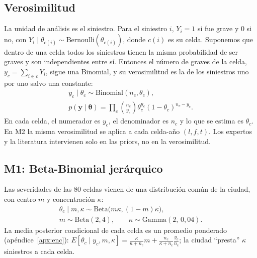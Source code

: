 \documentclass[10pt,twocolumn]{article}
\begin{document}
\subsection{Verosimilitud}
La unidad de análisis es el siniestro. Para el siniestro $i$, $Y_i=1$ si fue grave y $0$ si no, con $Y_i\mid\theta_{c(i)}\sim\mathrm{Bernoulli}(\theta_{c(i)})$, donde $c(i)$ es su celda. Suponemos que dentro de una celda todos los siniestros tienen la misma probabilidad de ser graves y son independientes entre sí. Entonces el número de graves de la celda, $y_c=\sum_{i\in c}Y_i$, sigue una Binomial, y su verosimilitud es la de los siniestros uno por uno salvo una constante:
\begin{gather}
y_c\mid\theta_c\sim\mathrm{Binomial}(n_c,\theta_c),\nonumber\\
p(\bm y\mid\bm\theta)=\prod_{c}\binom{n_c}{y_c}\theta_c^{y_c}(1-\theta_c)^{n_c-y_c}.\label{eq:lik}
\end{gather}
En cada celda, el numerador es $y_c$, el denominador es $n_c$ y lo que se estima es $\theta_c$. En M2 la misma verosimilitud se aplica a cada celda-año $(l,f,t)$. Los expertos y la literatura intervienen solo en las priors, no en la verosimilitud.

\subsection{M1: Beta-Binomial jerárquico}
Las severidades de las 80 celdas vienen de una distribución común de la ciudad, con centro $m$ y concentración $\kappa$:
\begin{gather}
\theta_c\mid m,\kappa\sim\mathrm{Beta}\big(m\kappa,(1-m)\kappa\big),\nonumber\\
m\sim\mathrm{Beta}(2,4),\qquad \kappa\sim\mathrm{Gamma}(2,\,0{,}04).\label{eq:m1}
\end{gather}
La media posterior condicional de cada celda es un promedio ponderado (apéndice~\ref{apx:enc}): $E[\theta_c\mid y_c,m,\kappa]=\frac{\kappa}{\kappa+n_c}m+\frac{n_c}{\kappa+n_c}\frac{y_c}{n_c}$; la ciudad ``presta'' $\kappa$ siniestros a cada celda.
\end{document}
